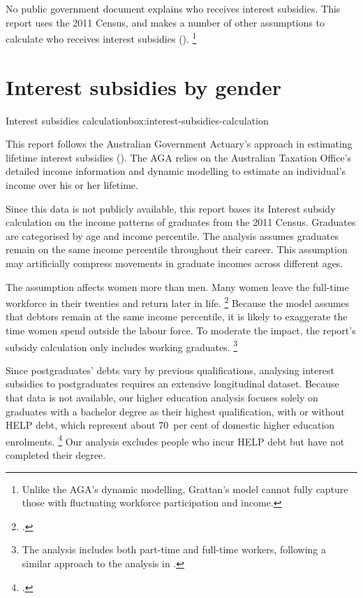\documentclass{grattan}
\begin{document}
No public government document explains who receives interest subsidies. This report uses the 2011 Census, and makes a number of other assumptions to calculate who receives interest subsidies ().%
   \footnote{Unlike the \gls{AGA}'s dynamic modelling, Grattan's model cannot fully capture those with fluctuating workforce participation and income.}

\section{Interest subsidies by gender}\label{sec:interest-subsidies-by-gender}

\begin{bigbox*}{Interest subsidies calculation}{box:interest-subsidies-calculation}

This report follows the Australian Government Actuary's approach in estimating lifetime interest subsidies ().
The \gls{AGA} relies on the Australian Taxation Office's detailed income information and dynamic modelling to estimate an individual's income over his or her lifetime. 

Since this data is not publicly available, this report bases its \gls{Interest subsidy} calculation on the income patterns of graduates from the 2011 Census.
Graduates are categorised by age and income percentile. The analysis assumes graduates remain on the same income percentile throughout their career.
This assumption may artificially compress movements in graduate incomes across different ages.

The assumption affects women more than men.
Many women leave the full-time workforce in their twenties and return later in life.%
\footcite[][Figure~9]{Norton2016HELPfuturefairer} Because the model assumes that debtors remain at the same income percentile, it is likely to exaggerate the time women spend outside the labour force.
To moderate the impact, the report's subsidy calculation only includes working graduates.%
   \footnote{The analysis includes both part-time and full-time workers, following a similar approach to the analysis in \textcite[][7--8]{Chapman2014InquiryprovisionsHigher}.}

Since postgraduates’ debts vary by previous qualifications, analysing interest subsidies to postgraduates requires an extensive longitudinal dataset. Because that data is not available, our higher education analysis focuses solely on graduates with a bachelor degree as their highest qualification, with or without \gls{HELP} debt, which represent about 70~per cent of domestic higher education enrolments.%
   \footnote{\textcite[][Table 2.6]{Education2016StudentsSelectedhigher}.} Our analysis excludes people who incur \gls{HELP} debt but have not completed their degree.


\end{bigbox*}
\end{document}
